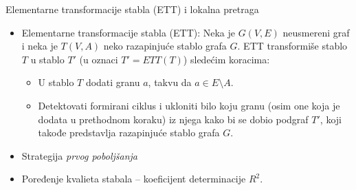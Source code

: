 \documentclass{beamer}
\begin{document}
\begin{frame}{Elementarne transformacije stabla (ETT) i lokalna pretraga}
\begin{itemize}
\small
    \item Elementarne transformacije stabla (ETT): Neka je $G(V, E)$ neusmereni graf i neka je $T(V, A)$ neko razapinjuće stablo grafa $G$. ETT transformiše stablo $T$ u stablo $T'$ (u oznaci $T' = ETT(T)$) sledećim koracima:
    \begin{itemize}
        \item U stablo $T$ dodati granu $a$, takvu da $a \in E \setminus A$.
        \item Detektovati formirani ciklus i ukloniti bilo koju granu (osim one koja je dodata u prethodnom koraku) iz njega kako bi se dobio podgraf $T'$, koji takođe predstavlja razapinjuće stablo grafa $G$.
    \end{itemize}
    \item Strategija \textit{prvog poboljšanja}%
    \item Poređenje kvalieta stabala -- koeficijent determinacije $R^{2}$. 
\end{itemize}
\end{frame}

\end{document}
